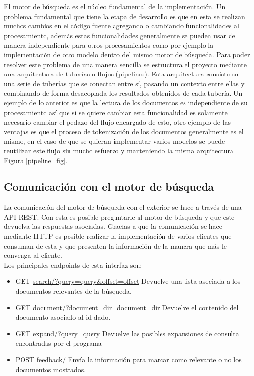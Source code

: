\documentclass[runningheads]{llncs}
\begin{document}
El motor de búsqueda es el núcleo fundamental de la implementación. Un problema fundamental que
tiene la etapa de desarrollo es que en esta se realizan muchos cambios en el código fuente agregando
o cambiando funcionalidades al procesamiento, además estas funcionalidades generalmente se pueden usar
de manera independiente para otros procesamientos como por ejemplo la implementación de otro modelo
dentro del mismo motor de búsqueda. Para poder resolver este problema de una manera sencilla se estructura
el proyecto mediante una arquitectura de tuberías o flujos (pipelines). Esta arquitectura consiste en una serie
de tuberías que se conectan entre sí, pasando un contexto entre ellas y combinando de forma desacoplada
los resultados obtenidos de cada tubería. Un ejemplo de lo anterior es que la lectura de los documentos
es independiente de su procesamiento así que si se quiere cambiar esta funcionalidad es solamente necesario
cambiar el pedazo del flujo encargado de esto, otro ejemplo de las ventajas es que el proceso de
tokenización de los documentos generalmente es el mismo, en el caso de que se quieran implementar varios
modelos se puede reutilizar este flujo sin mucho esfuerzo y manteniendo la misma arquitectura Figura \ref{pipeline_fig}.

\subsection{Comunicación con el motor de búsqueda}

La comunicación del motor de búsqueda con el exterior se hace a través de una API REST. Con esta
es posible preguntarle al motor de búsqueda y que este devuelva las respuestas asociadas. Gracias
a que la comunicación se hace mediante HTTP es posible realizar la implementación de varios clientes
que consuman de esta y que presenten la información de la manera que más le convenga al cliente.\\

Los principales endpoints de esta interfaz son:

\begin{itemize}
    \item GET \url{search/?query=query\&offset=offset} Devuelve una lista asociada a los
documentos relevantes de la búsqueda.
    \item GET \url{document/?document\_dir=document\_dir} Devuelve el contenido del documento asociado
al id dado.
	\item GET \url{expand/?query=query} Devuelve las posibles expansiones de consulta encontradas por el programa
	\item POST \url{feedback/} Envía la información para marcar como relevante o no los documentos mostrados.
\end{itemize}
\end{document}
